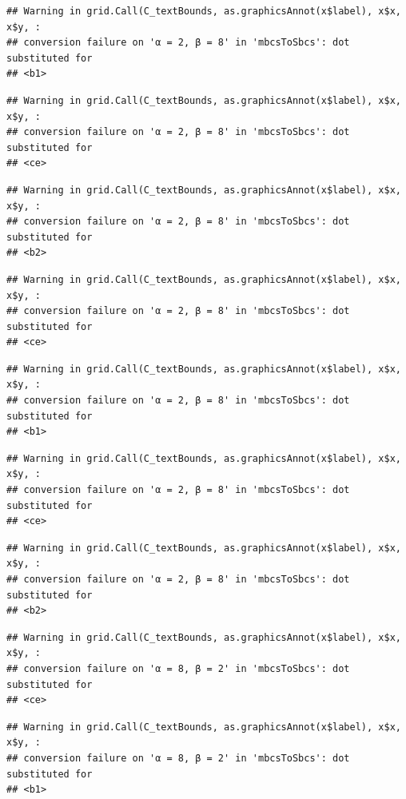 \documentclass[]{book}
\theoremstyle{definition}
\theoremstyle{definition}
\theoremstyle{definition}
\theoremstyle{remark}
\begin{document}
\begin{verbatim}
## Warning in grid.Call(C_textBounds, as.graphicsAnnot(x$label), x$x, x$y, :
## conversion failure on 'α = 2, β = 8' in 'mbcsToSbcs': dot substituted for
## <b1>
\end{verbatim}

\begin{verbatim}
## Warning in grid.Call(C_textBounds, as.graphicsAnnot(x$label), x$x, x$y, :
## conversion failure on 'α = 2, β = 8' in 'mbcsToSbcs': dot substituted for
## <ce>
\end{verbatim}

\begin{verbatim}
## Warning in grid.Call(C_textBounds, as.graphicsAnnot(x$label), x$x, x$y, :
## conversion failure on 'α = 2, β = 8' in 'mbcsToSbcs': dot substituted for
## <b2>
\end{verbatim}

\begin{verbatim}
## Warning in grid.Call(C_textBounds, as.graphicsAnnot(x$label), x$x, x$y, :
## conversion failure on 'α = 2, β = 8' in 'mbcsToSbcs': dot substituted for
## <ce>
\end{verbatim}

\begin{verbatim}
## Warning in grid.Call(C_textBounds, as.graphicsAnnot(x$label), x$x, x$y, :
## conversion failure on 'α = 2, β = 8' in 'mbcsToSbcs': dot substituted for
## <b1>
\end{verbatim}

\begin{verbatim}
## Warning in grid.Call(C_textBounds, as.graphicsAnnot(x$label), x$x, x$y, :
## conversion failure on 'α = 2, β = 8' in 'mbcsToSbcs': dot substituted for
## <ce>
\end{verbatim}

\begin{verbatim}
## Warning in grid.Call(C_textBounds, as.graphicsAnnot(x$label), x$x, x$y, :
## conversion failure on 'α = 2, β = 8' in 'mbcsToSbcs': dot substituted for
## <b2>
\end{verbatim}

\begin{verbatim}
## Warning in grid.Call(C_textBounds, as.graphicsAnnot(x$label), x$x, x$y, :
## conversion failure on 'α = 8, β = 2' in 'mbcsToSbcs': dot substituted for
## <ce>
\end{verbatim}

\begin{verbatim}
## Warning in grid.Call(C_textBounds, as.graphicsAnnot(x$label), x$x, x$y, :
## conversion failure on 'α = 8, β = 2' in 'mbcsToSbcs': dot substituted for
## <b1>
\end{verbatim}
\end{document}
